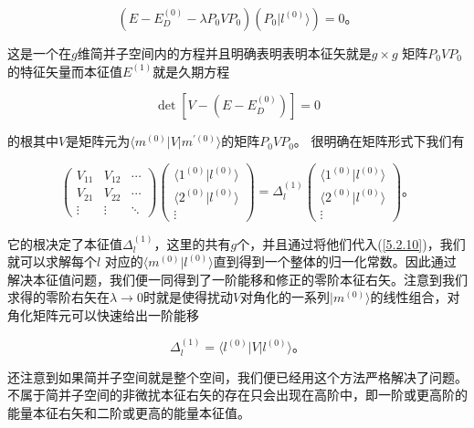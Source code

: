 ﻿\documentclass[UTF8,twoside]{ctexart}
\begin{document}
\begin{equation} \label{5.2.8}
(E-E_D^{(0)}-\lambda P_0 V P_0)(P_0 |l^{(0)}\rangle) = 0\text{。}
\end{equation}

\noindent 这是一个在$g$维简并子空间内的方程并且明确表明表明本征矢就是$g\times g$ 矩阵$P_0 V P_0$ 的特征矢量而本征值$E^{(1)}$就是久期方程

\begin{equation} \label{5.2.9}
\det[V-(E-E_D^{(0)})]=0
\end{equation}

\noindent 的根其中$V$是矩阵元为$\langle m^{(0)}|V|m^{\prime{(0)}}\rangle$的矩阵$P_0 V P_0$。 很明确在矩阵形式下我们有

\begin{equation} \label{5.2.10}
\left(\begin{array}{ccc}
V_{11} & V_{12} & \cdots \\
V_{21} & V_{22} & \cdots \\
\vdots & \vdots & \ddots
\end{array}\right) \left(\begin{array}{c}
\langle 1^{(0)}|l^{(0)}\rangle \\
\langle 2^{(0)}|l^{(0)}\rangle \\
\vdots
\end{array}\right) = \Delta_l^{(1)} \left(\begin{array}{c}
\langle 1^{(0)}|l^{(0)}\rangle \\
\langle 2^{(0)}|l^{(0)}\rangle \\
\vdots
\end{array}\right)\text{。}
\end{equation}

\noindent 它的根决定了本征值$\Delta_l^{(1)}$，这里的共有$g$个，并且通过将他们代入(\ref{5.2.10})，我们就可以求解每个$l$ 对应的$\langle m^{(0)}|l^{(0)}\rangle$直到得到一个整体的归一化常数。因此通过解决本征值问题，我们便一同得到了一阶能移和修正的零阶本征右矢。注意到我们求得的零阶右矢在$\lambda\rightarrow0$时就是使得扰动$V$对角化的一系列$|m^{(0)}\rangle$的线性组合，对角化矩阵元可以快速给出一阶能移

\begin{equation} \label{5.2.11}
\Delta_l^{(1)} = \langle l^{(0)}|V|l^{(0)}\rangle\text{。}
\end{equation}

\noindent 还注意到如果简并子空间就是整个空间，我们便已经用这个方法严格解决了问题。不属于简并子空间的非微扰本征右矢的存在只会出现在高阶中，即一阶或更高阶的能量本征右矢和二阶或更高的能量本征值。
\end{document}
